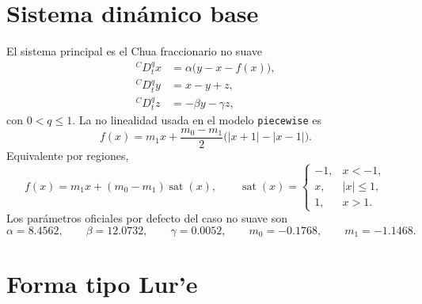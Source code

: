 \documentclass[11pt]{article}
\newcommand{\sat}{\operatorname{sat}}
\begin{document}
\section{Sistema dinámico base}

El sistema principal es el Chua fraccionario no suave
\begin{align}
{}^C D_t^q x &= \alpha\bigl(y-x-f(x)\bigr),\label{eq:chua_x}\\
{}^C D_t^q y &= x-y+z,\label{eq:chua_y}\\
{}^C D_t^q z &= -\beta y-\gamma z,\label{eq:chua_z}
\end{align}
con \(0<q\leq 1\). La no linealidad usada en el modelo \texttt{piecewise} es
\begin{equation}
 f(x)=m_1x+\frac{m_0-m_1}{2}\bigl(|x+1|-|x-1|\bigr).
 \label{eq:chua_pwl}
\end{equation}
Equivalente por regiones,
\begin{equation}
 f(x)=m_1x+(m_0-m_1)\sat(x),
 \qquad
 \sat(x)=
 \begin{cases}
 -1, & x<-1,\\
 x, & |x|\leq 1,\\
 1, & x>1.
 \end{cases}
\end{equation}
Los parámetros oficiales por defecto del caso no suave son
\begin{equation}
\alpha=8.4562,
\qquad
\beta=12.0732,
\qquad
\gamma=0.0052,
\qquad
m_0=-0.1768,
\qquad
m_1=-1.1468.
\label{eq:params_official}
\end{equation}

\section{Forma tipo Lur'e}
\end{document}
